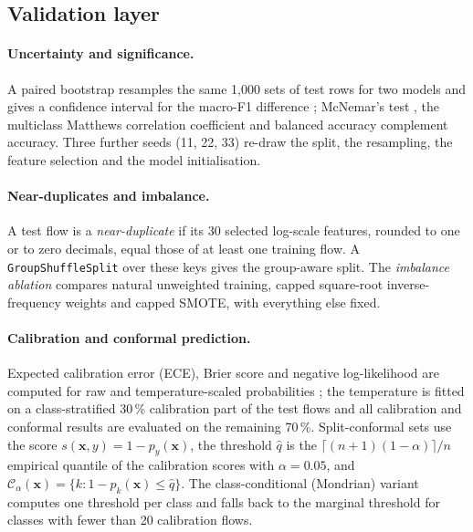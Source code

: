 \documentclass[11pt,a4paper]{article}
\begin{document}
\subsection{Validation layer}
\label{sec:validation}
\paragraph{Uncertainty and significance.} A paired bootstrap resamples the same 1{,}000 sets of test rows for two models and gives a confidence interval for the macro-F1 difference \parencite{efron1993}; McNemar's test \parencite{mcnemar1947}, the multiclass Matthews correlation coefficient \parencite{matthews1975} and balanced accuracy complement accuracy. Three further seeds (11, 22, 33) re-draw the split, the resampling, the feature selection and the model initialisation.

\paragraph{Near-duplicates and imbalance.} A test flow is a \emph{near-duplicate} if its 30 selected log-scale features, rounded to one or to zero decimals, equal those of at least one training flow. A \texttt{GroupShuffleSplit} over these keys gives the group-aware split. The \emph{imbalance ablation} compares natural unweighted training, capped square-root inverse-frequency weights and capped SMOTE, with everything else fixed.

\paragraph{Calibration and conformal prediction.} Expected calibration error (ECE), Brier score and negative log-likelihood are computed for raw and temperature-scaled probabilities \parencite{guo2017}; the temperature is fitted on a class-stratified 30\,\% calibration part of the test flows and all calibration and conformal results are evaluated on the remaining 70\,\%. Split-conformal sets \parencite{vovk2005,angelopoulos2023} use the score $s(\mathbf{x},y)=1-p_y(\mathbf{x})$, the threshold $\hat q$ is the $\lceil(n+1)(1-\alpha)\rceil/n$ empirical quantile of the calibration scores with $\alpha=0.05$, and $\mathcal{C}_\alpha(\mathbf{x})=\{k: 1-p_k(\mathbf{x})\leq\hat q\}$. The class-conditional (Mondrian) variant computes one threshold per class and falls back to the marginal threshold for classes with fewer than 20 calibration flows.
\end{document}
